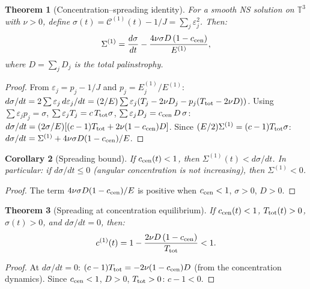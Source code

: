 \documentclass[11pt]{article}
\newtheorem{theorem}{Theorem}[section]
\newtheorem{corollary}[theorem]{Corollary}
\theoremstyle{definition}
\newcommand{\T}{\mathbb{T}}
\newcommand{\cC}{\mathcal{C}}
\begin{document}
\begin{theorem}[Concentration--spreading identity]
\label{thm:conc-spread}
For a smooth NS solution on $\T^3$ with $\nu>0$,
define $\sigma(t) = \cC^{(1)}(t)-1/J
= \sum_j\varepsilon_j^2$.  Then:
\begin{equation}\label{eq:conc-spread}
\Sigma^{(1)} = \frac{d\sigma}{dt}
- \frac{4\nu\sigma D\,(1-c_{\rm cen})}{E^{(1)}},
\end{equation}
where $D = \sum_j D_j$ is the total palinstrophy.
\end{theorem}

\begin{proof}
From $\varepsilon_j = p_j - 1/J$ and
$p_j = E_j^{(1)}/E^{(1)}$:
$d\sigma/dt = 2\sum\varepsilon_j\,d\varepsilon_j/dt
= (2/E)\sum\varepsilon_j(T_j-2\nu D_j
- p_j(T_{\rm tot}-2\nu D))$.
Using $\sum\varepsilon_j p_j = \sigma$,
$\sum\varepsilon_j T_j = c\,T_{\rm tot}\sigma$,
$\sum\varepsilon_j D_j = c_{\rm cen}\,D\,\sigma$:
$d\sigma/dt = (2\sigma/E)[(c-1)T_{\rm tot}
+ 2\nu(1-c_{\rm cen})D]$.
Since $(E/2)\Sigma^{(1)} = (c-1)T_{\rm tot}\sigma$:
$d\sigma/dt = \Sigma^{(1)}
+ 4\nu\sigma D(1-c_{\rm cen})/E$.
\end{proof}

\begin{corollary}[Spreading bound]
\label{cor:spread-bound}
If $c_{\rm cen}(t)<1$, then
$\Sigma^{(1)}(t) < d\sigma/dt$.
In particular: if $d\sigma/dt\leq 0$ (angular
concentration is not increasing), then
$\Sigma^{(1)}<0$.
\end{corollary}

\begin{proof}
The term $4\nu\sigma D(1-c_{\rm cen})/E$ is
positive when $c_{\rm cen}<1$, $\sigma>0$, $D>0$.
\end{proof}

\begin{theorem}[Spreading at concentration
equilibrium]
\label{thm:equil}
If $c_{\rm cen}(t)<1$, $T_{\rm tot}(t)>0$,
$\sigma(t)>0$, and $d\sigma/dt = 0$, then:
\begin{equation}\label{eq:c-at-equil}
c^{(1)}(t) = 1 - \frac{2\nu D\,(1-c_{\rm cen})}
{T_{\rm tot}} < 1.
\end{equation}
\end{theorem}

\begin{proof}
At $d\sigma/dt = 0$:
$(c-1)T_{\rm tot} = -2\nu(1-c_{\rm cen})D$
(from the concentration dynamics).
Since $c_{\rm cen}<1$, $D>0$, $T_{\rm tot}>0$:
$c-1<0$.
\end{proof}
\end{document}
